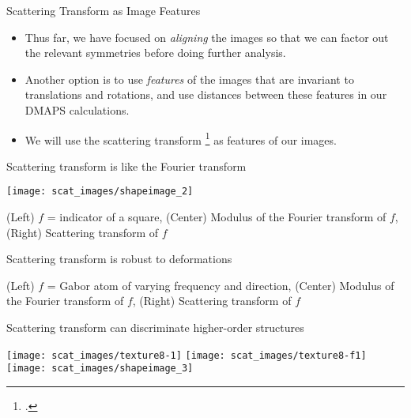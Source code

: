 \begin{frame}{Scattering Transform as Image Features}

{\small 
\begin{itemize}
	\item Thus far, we have focused on {\em aligning} the images so that we can factor out the relevant symmetries before doing further analysis. 
	\item Another option is to use {\em features} of the images that are invariant to translations and rotations, and use distances between these features in our DMAPS calculations.
	\item 
	We will use the scattering transform \footcite{bruna2012invariant} as features of our images.
\end{itemize}
\par}
\vspace{-0.15in}
\begin{minipage}{0.55\textwidth}
\begin{block}{{\small Scattering transform is like the Fourier transform \par}}
\centering 
\texttt{[image: scat\_images/shapeimage\_2]}\\
{\tiny (Left) $f$ = indicator of a square, (Center) Modulus of the Fourier transform of $f$, (Right) Scattering transform of $f$ \par}
\end{block}

\vspace{-0.1in}
\begin{block}{{\small Scattering transform is robust to deformations \par}}
\centering
{} 

{\tiny (Left) $f$ = Gabor atom of varying frequency and direction, (Center) Modulus of the Fourier transform of $f$, (Right) Scattering transform of $f$ \par}
\end{block}

\end{minipage}
\hfill
\begin{minipage}{0.4\textwidth}
\begin{block}{{\small Scattering transform can discriminate higher-order structures \par}}
\texttt{[image: scat\_images/texture8-1]}
\texttt{[image: scat\_images/texture8-f1]}
\texttt{[image: scat\_images/shapeimage\_3]}


\end{block}
\end{minipage}
\end{frame}
